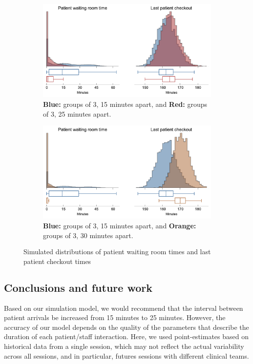 \documentclass[11pt]{article}
\begin{document}
\begin{figure}[H]
  \begin{subfigure}[b]{\textwidth}\centering
  \includegraphics[width=0.8\linewidth]{3_15_3_25_hist1.pdf}
  \caption{\textbf{\textcolor{blue!80!white!60!black}{Blue:}} groups of 3, 15 minutes apart, and \textbf{\textcolor{red!80!white!60!black}{Red:}} groups of 3, 25 minutes apart.}
  \label{fig:compare-hist-25}
  \end{subfigure}
  \begin{subfigure}[b]{\textwidth}\centering
  \includegraphics[width=0.8\linewidth]{3_15_3_30_hist1.pdf}
  \caption{\textbf{\textcolor{blue!80!white!60!black}{Blue:}} groups of 3, 15 minutes apart, and \textbf{\textcolor{orange!80!white!60!black}{Orange:}} groups of 3, 30 minutes apart.}
  \label{fig:compare-hist-30}
  \end{subfigure}
  \caption{Simulated distributions of patient waiting room times and last patient checkout times}
\end{figure}
\subsection*{Conclusions and future work}
Based on our simulation model, we would recommend that the interval between patient arrivals be increased from 15 minutes to 25 minutes. However, the accuracy of our model depends on the quality of the parameters that describe the duration of each patient/staff interaction. Here, we used point-estimates based on historical data from a single session, which may not reflect the actual variability across all sessions, and in particular, futures sessions with different clinical teams.
\end{document}

